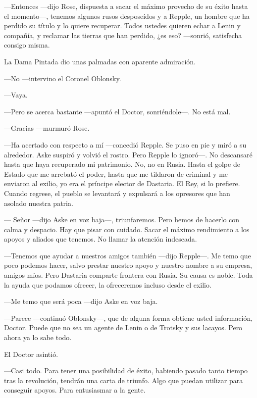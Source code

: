 {---Entonces ---dijo Rose, dispuesta a sacar el máximo provecho de su
	éxito hasta el momento---, tenemos algunos rusos desposeídos y a Repple,
	un hombre que ha perdido su título y lo quiere recuperar. Todos ustedes
	quieren echar a Lenin y compañía, y reclamar las tierras que han
perdido, ¿es eso? ---sonrió, satisfecha consigo misma.}

{La Dama Pintada dio unas palmadas con aparente admiración.}

{---No ---intervino el Coronel Oblonsky.}

{---Vaya.}

{---Pero se acerca bastante ---apuntó el Doctor, sonriéndole---. No está
mal.}

{---Gracias ---murmuró Rose.}

{---Ha acertado con respecto a mí ---concedió Repple. Se puso en pie y
	miró a su alrededor. Aske suspiró y volvió el rostro. Pero Repple lo
	ignoró---. No descansaré hasta que haya recuperado mi patrimonio. No, no
	en Rusia. Hasta el golpe de Estado que me arrebató el poder, hasta que
	me tildaron de criminal y me enviaron al exilio, yo era el príncipe
	elector de Dastaria. El Rey, si lo prefiere. Cuando regrese, el pueblo
	se levantará y expulsará a los opresores que han asolado nuestra
patria.}

{--- Señor ---dijo Aske en voz baja---, triunfaremos. Pero hemos de
	hacerlo con calma y despacio. Hay que pisar con cuidado. Sacar el máximo
	rendimiento a los apoyos y aliados que tenemos. No llamar la atención
indeseada.}

{---Tenemos que ayudar a nuestros amigos también ---dijo Repple---. Me
	temo que poco podemos hacer, salvo prestar nuestro apoyo y nuestro
	nombre a su empresa, amigos míos. Pero Dastaria comparte frontera con
	Rusia. Su causa es noble. Toda la ayuda que podamos ofrecer, la
ofreceremos incluso desde el exilio.}

{---Me temo que será poca ---dijo Aske en voz baja.}

{---Parece ---continuó Oblonsky---, que de alguna forma obtiene usted
	información, Doctor. Puede que no sea un agente de Lenin o de Trotsky y
sus lacayos. Pero ahora ya lo sabe todo.}

{El Doctor asintió.}

{---Casi todo. Para tener una posibilidad de éxito, habiendo pasado
	tanto tiempo tras la revolución, tendrán una carta de triunfo. Algo que
puedan utilizar para conseguir apoyos. Para entusiasmar a la gente.}

